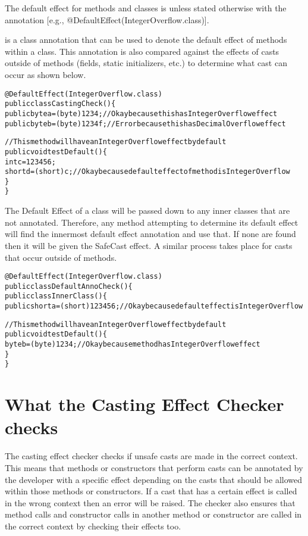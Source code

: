 The default effect for methods and classes is  unless stated otherwise with the  annotation [e.g., @DefaultEffect(IntegerOverflow.class)].

 is a class annotation that can be used to denote the default effect of methods within a class. This annotation is also compared against the effects of casts outside of methods (fields, static initializers, etc.) to determine what cast can occur as shown below.

\begin{alltt}
@DefaultEffect(IntegerOverflow.class)
public class CastingCheck() \{
    public byte a = (byte) 1234; //Okay because this has IntegerOverflow effect
    public byte b = (byte) 1234f; //Error because this has DecimalOverflow effect

    //This method will have an IntegerOverflow effect by default
    public void testDefault() \{
        int c = 123456;
        short d = (short) c; //Okay because default effect of method is IntegerOverflow
    \}
\}
\end{alltt}

The Default Effect of a class will be passed down to any inner classes that are not annotated. Therefore, any method attempting to determine its default effect will find the innermost default effect annotation and use that. If none are found then it will be given the SafeCast effect. A similar process takes place for casts that occur outside of methods.
\begin{alltt}
@DefaultEffect(IntegerOverflow.class)
public class DefaultAnnoCheck() \{
    public class InnerClass() \{
        public short a = (short) 123456; //Okay because default effect is IntegerOverflow

        //This method will have an IntegerOverflow effect by default
        public void testDefault() \{
            byte b = (byte) 1234; //Okay because method has IntegerOverflow effect
        \}
\}
\end{alltt}


\section{What the Casting Effect Checker checks\label{castingeffect-checks}}

The casting effect checker checks if unsafe casts are made in the correct context. This means that methods or constructors that perform casts can be annotated by the developer with a specific effect depending on the casts that should be allowed within those methods or constructors. If a cast that has a certain effect is called in the wrong context then an error will be raised. The checker also ensures that method calls and constructor calls in another method or constructor are called in the correct context by checking their effects too.

